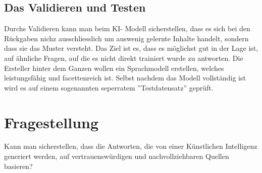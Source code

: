 \documentclass{report}
\begin{document}
\subsection{Das Validieren und Testen}
Durchs Validieren kann man beim KI- Modell sicherstellen, dass es sich bei den Rückgaben nichz ausschliesslich um auswenig gelernte Inhalte handelt, sondern dass sie das Muster versteht. Das Ziel ist es, dass es möglichst gut in der Lage ist, auf ähnliche Fragen, auf die es nicht direkt trainiert wurde zu antworten. Die Ersteller hinter dem Ganzen wollen ein Sprachmodell erstellen, welches leistungsfähig und facettenreich ist. Selbst nachdem das Modell vollständig ist wird es auf einem sogenannten seperratem ''Testdatensatz'' geprüft.


\section{Fragestellung}
Kann man sicherstellen, dass die Antworten, die von einer Künstlichen Intelligenz generiert werden, auf vertrauenswürdigen und nachvollziehbaren Quellen basieren?
\end{document}
